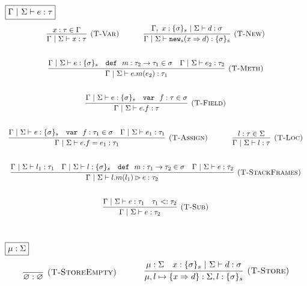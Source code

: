 \documentclass{llncs}
\newcommand{\keywadj}[1]{\mathtt{#1}}
\newcommand{\keyw}[1]{\keywadj{#1}~}
\begin{document}
$\fbox{$\Gamma~|~\Sigma \vdash e : \tau$}$
\[
\begin{array}{c}
\infer[\textsc{(T-Var)}]
  {\Gamma~|~\Sigma \vdash x : \tau}
  {x : \tau \in \Gamma}%
~~~~~~~~~~
\infer[\textsc{(T-New)}]
	{\Gamma~|~\Sigma \vdash\keywadj{new}_{s}(x \Rightarrow d) : \{ \sigma \}_{s}}
	{\Gamma,~x : \{ \sigma \}_{s}~|~\Sigma \vdash d : \sigma} \\[5ex]

\infer[\textsc{(T-Meth)}]
	{\Gamma~|~\Sigma \vdash  e.m(e_2) : \tau_1} 
	{\Gamma~|~\Sigma \vdash e : \{\sigma\}_s  & \keyw{def}~ m : \tau_2 \rightarrow \tau_1 \in \sigma & \Gamma~|~\Sigma \vdash e_2 : \tau_2}\\[5ex]

\infer[\textsc{(T-Field)}]
	{\Gamma~|~\Sigma \vdash  e.f : \tau} 
	{\Gamma~|~\Sigma \vdash e : \{\sigma\}_s & \keyw{var}~ f : \tau \in \sigma }\\[5ex]
	
\infer[\textsc{(T-Assign)}]
	{\Gamma~|~\Sigma \vdash  e.f=e_1 : \tau_1} 
	{\Gamma~|~\Sigma \vdash e : \{\sigma\}_s & \keyw{var}~ f:\tau_1 \in \sigma & \Gamma~|~\Sigma \vdash e_1 : \tau_1 }%
~~~~~~~~~~
\infer[\textsc{(T-Loc)}]
  {\Gamma~|~\Sigma \vdash l : \tau}
  {l : \tau \in \Sigma}\\[5ex]

\infer[\textsc{(T-StackFrames)}]
	{\Gamma~|~\Sigma \vdash l.m(l_1) \rhd e : \tau_2}
	{\Gamma~|~\Sigma \vdash l_1 : \tau_1 & \Gamma~|~\Sigma \vdash l : \{\sigma\}_s & \keyw{def}~ m : \tau_1 \rightarrow \tau_2 \in \sigma & \Gamma~|~\Sigma \vdash e : \tau_2} \\[5ex]

\infer[\textsc{(T-Sub)}]
  {\Gamma~|~\Sigma \vdash e : \tau_2}
  {\Gamma~|~\Sigma \vdash e : \tau_1 & \tau_1 <: \tau_2}\\[5ex]

\end{array}
\]

$\fbox{$\mu : \Sigma$}$
\[
\begin{array}{c}

\infer[\textsc{(T-StoreEmpty)}]
  {\varnothing : \varnothing}
  {}%
~~~~~~~~~~
\infer[\textsc{(T-Store)}]
  {\mu, l \mapsto \{ x \Rightarrow d \} : \Sigma, l : \{ \sigma \}_s}
  {\mu : \Sigma & x : \{ \sigma \}_s~|~\Sigma \vdash d : \sigma}\\[5ex]

\end{array}
\]
\end{document}
